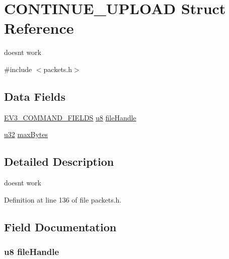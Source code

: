 \hypertarget{struct_c_o_n_t_i_n_u_e___u_p_l_o_a_d}{}\section{C\+O\+N\+T\+I\+N\+U\+E\+\_\+\+U\+P\+L\+O\+A\+D Struct Reference}
\label{struct_c_o_n_t_i_n_u_e___u_p_l_o_a_d}


doesn\textquotesingle{}t work  




{\ttfamily \#include $<$packets.\+h$>$}

\subsection*{Data Fields}
\begin{DoxyCompactItemize}
\item 
\hyperlink{packets_8h_a0c26a010ef0da2962a751796943824c9}{E\+V3\+\_\+\+C\+O\+M\+M\+A\+N\+D\+\_\+\+F\+I\+E\+L\+D\+S} \hyperlink{defs_8h_a92c50087ca0e64fa93fc59402c55f8ca}{u8} \hyperlink{struct_c_o_n_t_i_n_u_e___u_p_l_o_a_d_a56fd3710165ab3fa738989d317905db6}{file\+Handle}
\item 
\hyperlink{defs_8h_afaa62991928fb9fb18ff0db62a040aba}{u32} \hyperlink{struct_c_o_n_t_i_n_u_e___u_p_l_o_a_d_ab55926fa545fd73b1bb3f48fab528c92}{max\+Bytes}
\end{DoxyCompactItemize}


\subsection{Detailed Description}
doesn\textquotesingle{}t work 

Definition at line 136 of file packets.\+h.



\subsection{Field Documentation}
\hypertarget{struct_c_o_n_t_i_n_u_e___u_p_l_o_a_d_a56fd3710165ab3fa738989d317905db6}{}
\subsubsection[{file\+Handle}]{ {\bf u8} file\+Handle}\label{struct_c_o_n_t_i_n_u_e___u_p_l_o_a_d_a56fd3710165ab3fa738989d317905db6}


